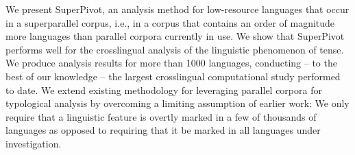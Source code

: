 We present SuperPivot, an analysis method for low-resource languages that occur in a superparallel corpus, i.e., in a corpus that contains an order of magnitude more languages than parallel corpora currently in use. We show that SuperPivot performs well for the crosslingual analysis of the linguistic phenomenon of tense. We produce analysis results for more than 1000 languages, conducting -- to the best of our knowledge -- the largest crosslingual computational study performed to date. We extend existing methodology for leveraging parallel corpora for typological analysis by overcoming a limiting assumption of earlier work: We only require that a linguistic feature is overtly marked in a few of thousands of languages as opposed to requiring that it be marked in all languages under investigation.
